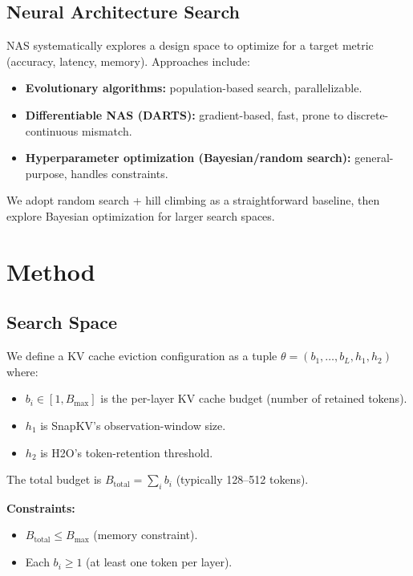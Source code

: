 \documentclass[11pt]{article}
\begin{document}
\subsection{Neural Architecture Search}

NAS systematically explores a design space to optimize for a target metric (accuracy, latency, memory). Approaches include:
\begin{itemize}
    \item \textbf{Evolutionary algorithms:} population-based search, parallelizable.
    \item \textbf{Differentiable NAS (DARTS):} gradient-based, fast, prone to discrete-continuous mismatch.
    \item \textbf{Hyperparameter optimization (Bayesian/random search):} general-purpose, handles constraints.
\end{itemize}

We adopt random search + hill climbing as a straightforward baseline, then explore Bayesian optimization for larger search spaces.

\section{Method}

\subsection{Search Space}

We define a KV cache eviction configuration as a tuple $\theta = (b_1, \ldots, b_L, h_1, h_2)$ where:
\begin{itemize}
    \item $b_i \in [1, B_{\max}]$ is the per-layer KV cache budget (number of retained tokens).
    \item $h_1$ is SnapKV's observation-window size.
    \item $h_2$ is H2O's token-retention threshold.
\end{itemize}

The total budget is $B_{\text{total}} = \sum_i b_i$ (typically 128–512 tokens).

\textbf{Constraints:}
\begin{itemize}
    \item $B_{\text{total}} \leq B_{\max}$ (memory constraint).
    \item Each $b_i \geq 1$ (at least one token per layer).
\end{itemize}
\end{document}
